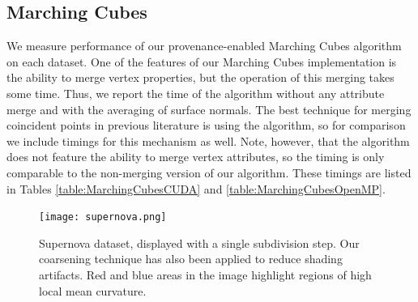 \documentclass[10pt,journal,cspaper,compsoc]{IEEEtran}
\begin{document}
\subsection{Marching Cubes}

We measure performance of our provenance-enabled Marching Cubes algorithm
on each dataset.  One of the features of our Marching Cubes implementation
is the ability to merge vertex properties, but the operation of this
merging takes some time.  Thus, we report the time of the algorithm without
any attribute merge and with the averaging of surface normals.  The best technique for
merging coincident points in previous literature is using the
 algorithm, so for comparison we include timings for this
mechanism as well.  Note, however, that the  algorithm
does not feature the ability to merge vertex attributes, so the timing is
only comparable to the non-merging version of our algorithm.  These timings
are listed in Tables \ref{table:MarchingCubesCUDA} and
\ref{table:MarchingCubesOpenMP}.


\begin{figure}[!tb]
\begin{center}
\texttt{[image: supernova.png]}
\caption{Supernova dataset, displayed with a single subdivision step. Our coarsening technique has also been applied to reduce shading artifacts. Red and blue areas in the image highlight regions of high local mean curvature.}
\label{fig:supernova}
\end{center}
\end{figure}
\end{document}
